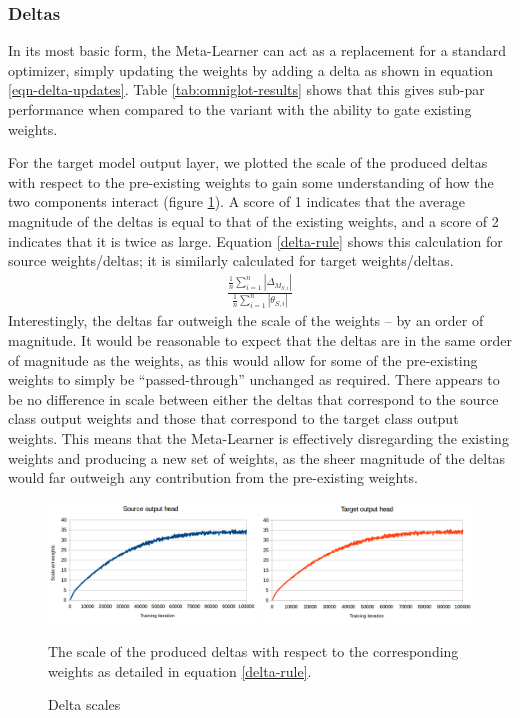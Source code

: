 \documentclass{report}
\newcommand\ddfrac[2]{\frac{\displaystyle #1}{\displaystyle #2}}
\begin{document}
\subsubsection{Deltas}
In its most basic form, the Meta-Learner can act as a replacement for a standard optimizer, simply updating the weights by adding a delta as shown in equation \ref{eqn-delta-updates}. Table \ref{tab:omniglot-results} shows that this gives sub-par performance when compared to the variant with the ability to gate existing weights. \par
For the target model output layer, we plotted the scale of the produced deltas with respect to the pre-existing weights to gain some understanding of how the two components interact (figure \ref{fig:deltascale:1}). A score of 1 indicates that the average magnitude of the deltas is equal to that of the existing weights, and a score of 2 indicates that it is twice as large. Equation \ref{delta-rule} shows this calculation for source weights/deltas; it is similarly calculated for target weights/deltas.
\begin{align} \label{delta-rule}
\ddfrac{\frac{1}{n}\sum_{i=1}^{n}|\Delta_{M_{S,i}}|}{\frac{1}{n}\sum_{i=1}^{n}|\theta_{S,i}|}
\end{align}
Interestingly, the deltas far outweigh the scale of the weights -- by an order of magnitude. It would be reasonable to expect that the deltas are in the same order of magnitude as the weights, as this would allow for some of the pre-existing weights to simply be ``passed-through'' unchanged as required. There appears to be no difference in scale between either the deltas that correspond to the source class output weights and those that correspond to the target class output weights. This means that the Meta-Learner is effectively disregarding the existing weights and producing a new set of weights, as the sheer magnitude of the deltas would far outweigh any contribution from the pre-existing weights.

\begin{figure}[h!]
	\centering
	\includegraphics[width=16cm]{deltascale}
	\caption{Delta scales}
	The scale of the produced deltas with respect to the corresponding weights as detailed in equation \ref{delta-rule}.
	\label{fig:deltascale:1}
\end{figure}
\end{document}
